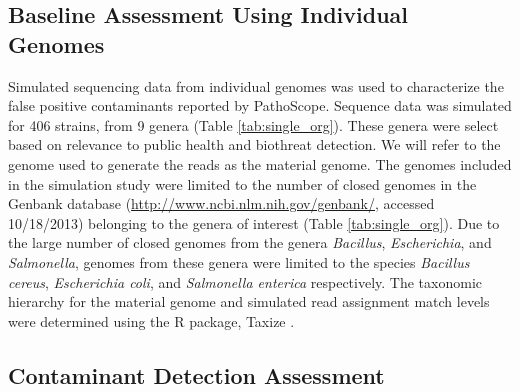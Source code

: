 \documentclass[fleqn,10pt,lineno]{wlpeerj}\usepackage[]{graphicx}\usepackage[]{color}
\begin{document}
\subsection*{Baseline Assessment Using Individual Genomes}
Simulated sequencing data from individual genomes was used to characterize the false positive contaminants reported by PathoScope.
Sequence data was simulated for 406 strains, from 9 genera (Table \ref{tab:single_org}).
These genera were select based on relevance to public health and biothreat detection.
We will refer to the genome used to generate the reads as the material genome.
The genomes included in the simulation study were limited to the number of closed genomes in the Genbank database (\url{http://www.ncbi.nlm.nih.gov/genbank/}, accessed 10/18/2013) belonging to the genera of interest (Table \ref{tab:single_org}).
Due to the large number of closed genomes from the genera \textit{Bacillus}, \textit{Escherichia}, and \textit{Salmonella}, genomes from these genera were limited to the species \textit{Bacillus cereus}, \textit{Escherichia coli}, and \textit{Salmonella enterica} respectively.
The taxonomic hierarchy for the material genome and simulated read assignment match levels were determined using the R package, Taxize \citep{TaxizeArticle,TaxizeManual}.

\subsection*{Contaminant Detection Assessment}
\end{document}
